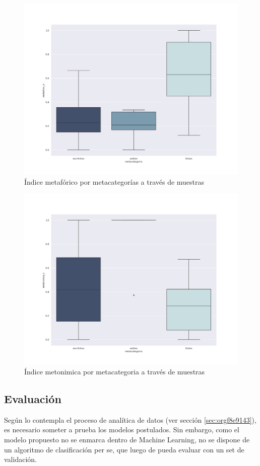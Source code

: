 \documentclass[12pt,letterpaper,twoside]{article}
\begin{document}
\begin{figure}[H]
\centering
\includegraphics[width=0.9\linewidth]{./resultados/graphs/total/metafora_total.png}
\caption{\label{fig:metafora_total} Índice metafórico por metacategorías a través de muestras }
\end{figure}

\begin{figure}[H]
\centering
\includegraphics[width=0.9\linewidth]{./resultados/graphs/total/metonimia_total.png}
\caption{\label{fig:metonimia_total} Índice metonimica por metacategoria a través de muestras }
\end{figure}

\subsection{Evaluación}
\label{sec:org388aca9}
Según lo contempla el proceso de analítica de datos (ver sección \ref{sec:orgf8e9143}),
es necesario someter a prueba los modelos postulados. Sin embargo, como el modelo propuesto
no se enmarca dentro de Machine Learning, no se dispone de un algoritmo de clasificación
per se, que luego de pueda evaluar con un set de validación.
\end{document}
